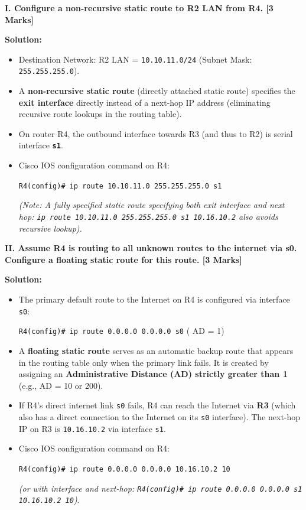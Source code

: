 \documentclass[11pt,a4paper]{article}
\begin{document}
\textbf{I. Configure a non-recursive static route to R2 LAN from R4. [3 Marks]}

\textbf{Solution:}
\begin{itemize}
    \item Destination Network: R2 LAN = \texttt{10.10.11.0/24} (Subnet Mask: \texttt{255.255.255.0}).
    \item A \textbf{non-recursive static route} (directly attached static route) specifies the \textbf{exit interface} directly instead of a next-hop IP address (eliminating recursive route lookups in the routing table).
    \item On router R4, the outbound interface towards R3 (and thus to R2) is serial interface \textbf{\texttt{s1}}.
    \item Cisco IOS configuration command on R4:
    \begin{center}
        \texttt{R4(config)\# ip route 10.10.11.0 255.255.255.0 s1}
    \end{center}
    \textit{(Note: A fully specified static route specifying both exit interface and next hop: \texttt{ip route 10.10.11.0 255.255.255.0 s1 10.16.10.2} also avoids recursive lookup).}
\end{itemize}

\vspace{0.2cm}
\textbf{II. Assume R4 is routing to all unknown routes to the internet via s0. Configure a floating static route for this route. [3 Marks]}

\textbf{Solution:}
\begin{itemize}
    \item The primary default route to the Internet on R4 is configured via interface \texttt{s0}:
    \begin{center}
        \texttt{R4(config)\# ip route 0.0.0.0 0.0.0.0 s0} \quad ( AD = 1)
    \end{center}
    \item A \textbf{floating static route} serves as an automatic backup route that appears in the routing table only when the primary link fails. It is created by assigning an \textbf{Administrative Distance (AD) strictly greater than 1} (e.g., AD = 10 or 200).
    \item If R4's direct internet link \texttt{s0} fails, R4 can reach the Internet via \textbf{R3} (which also has a direct connection to the Internet on its \texttt{s0} interface). The next-hop IP on R3 is \texttt{10.16.10.2} via interface \texttt{s1}.
    \item Cisco IOS configuration command on R4:
    \begin{center}
        \texttt{R4(config)\# ip route 0.0.0.0 0.0.0.0 10.16.10.2 10}
    \end{center}
    \textit{(or with interface and next-hop: \texttt{R4(config)\# ip route 0.0.0.0 0.0.0.0 s1 10.16.10.2 10})}.
\end{itemize}
\end{document}
